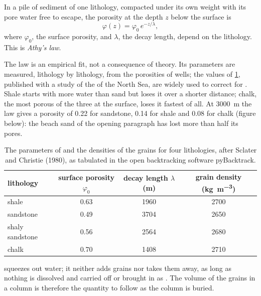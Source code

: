 \begin{proposition}\label{prop:b1:diagenesis-basins:athy}
In a pile of sediment of one lithology, compacted under its own weight with its
pore water free to escape, the porosity at the depth $z$ below the surface is
\[
  \varphi(z) = \varphi_0\, e^{-z/\lambda},
\]
where $\varphi_0$, the surface porosity, and $\lambda$, the decay length, depend
on the lithology. This is \emph{Athy's law}.
\end{proposition}
\admitted

The law is an empirical fit, not a consequence of theory. Its parameters are
measured, lithology by lithology, from the porosities of wells; the values of
\cref{tab:b1:diagenesis-basins:athy}, published with a study of the 
of the North Sea, are widely used to correct for . Shale starts with more water than sand
but loses it over a shorter distance; chalk, the most porous of the three at the
surface, loses it fastest of all. At \qty{3000}{m} the law gives a porosity of
\num{0.22} for sandstone, \num{0.14} for shale and \num{0.08} for chalk (figure
below): the beach sand of the opening paragraph has lost more than half its pores.

\begin{table}[htbp]
\centering
\begin{tabular}{lccc}
\hline
lithology & surface porosity $\varphi_0$ & decay length $\lambda$ (m) & grain density (\unit{kg.m^{-3}}) \\
\hline
shale            & 0.63 & 1960 & 2700 \\
sandstone        & 0.49 & 3704 & 2650 \\
shaly sandstone  & 0.56 & 2564 & 2680 \\
chalk            & 0.70 & 1408 & 2710 \\
\hline
\end{tabular}
\caption{The parameters of  and the densities of the grains for four
lithologies, after Sclater and Christie (1980), as tabulated in the open
backtracking software pyBacktrack.}
\label{tab:b1:diagenesis-basins:athy}
\end{table}

 squeezes out water; it neither adds grains nor takes them away, as
long as nothing is dissolved and carried off or brought in as . The volume
of the grains in a column is therefore the quantity to follow as the column is
buried.

